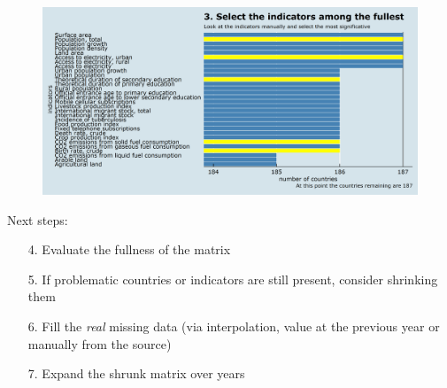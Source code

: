 \documentclass[9pt]{beamer}
\begin{document}
\begin{frame}
\begin{figure}
\centering
\includegraphics[width=\textwidth]{plot0007.png}
\end{figure}
\end{frame}

\begin{frame}
{Next steps:}
\begin{itemize} [<+->]
	\item[4.] Evaluate the fullness of the matrix
	\item[5.] If problematic countries or indicators are still present, consider shrinking them
	\item[6.] Fill the \textit{real} missing data (via interpolation, value at the previous year or manually from the source)
	\item[7.] Expand the shrunk matrix over years 
\end{itemize}
\end{frame}
\end{document}

